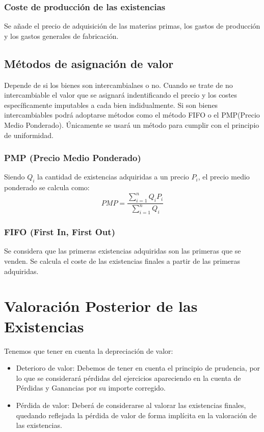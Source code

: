 \documentclass[a4paper,12pt]{article}
\begin{document}
\subsubsection{Coste de producción de las existencias}

Se añade el precio de adquisición de las materias primas, los gastos de producción y los gastos generales de fabricación.


\subsection{Métodos de asignación de valor}
Depende de si los bienes son intercambialaes o no. Cuando se trate de no intercambiable el valor que se asignará indentificando el precio y los costes específicamente imputables a cada bien indidualmente. Si son bienes intercambiables podrá adoptarse métodos como el método FIFO o el PMP(Precio Medio Ponderado). Únicamente se usará un método para cumplir con el principio de uniformidad.

\subsubsection{PMP (Precio Medio Ponderado)}

Siendo $Q_{i}$ la cantidad de existencias adquiridas a un precio $P_{i}$, el precio medio ponderado se calcula como:
\[
    PMP = \frac{\sum_{i=1}^{n}Q_{i}P_{i}}{\sum_{i=1}^{n}Q_{i}}
\]

\subsubsection{FIFO (First In, First Out)}

Se considera que las primeras existencias adquiridas son las primeras que se venden. Se calcula el coste de las existencias finales a partir de las primeras adquiridas.

\section{Valoración Posterior de las Existencias}

Tenemos que tener en cuenta la depreciación de valor:
\begin{itemize}
    \item Deterioro de valor: Debemos de tener en cuenta el principio de prudencia, por lo que se considerará pérdidas del ejercicios apareciendo en la cuenta de Pérdidas y Ganancias por su importe corregido.
    \item Pérdida de valor: Deberá de considerarse al valorar las existencias finales, quedando reflejada la pérdida de valor de forma implícita en la valoración de las existencias.
\end{itemize}
\end{document}
